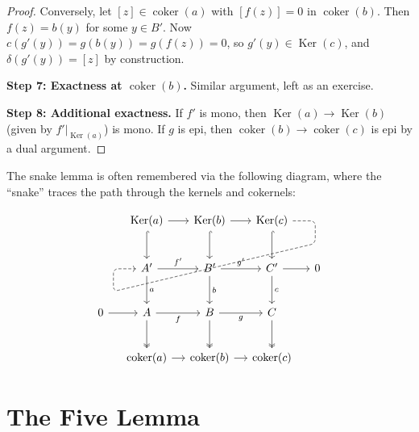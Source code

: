 \documentclass[a4paper,12pt]{book}
\DeclareMathOperator{\Ker}{Ker}
\DeclareMathOperator{\coker}{coker}
\theoremstyle{definition}
\theoremstyle{plain}
\theoremstyle{remark}
\begin{document}
\begin{proof}
Conversely, let $[z] \in \coker(a)$ with $[f(z)] = 0$ in $\coker(b)$. Then
$f(z) = b(y)$ for some $y \in B'$. Now $c(g'(y)) = g(b(y)) = g(f(z)) = 0$, so
$g'(y) \in \Ker(c)$, and $\delta(g'(y)) = [z]$ by construction.

\medskip\noindent
\textbf{Step 7: Exactness at $\coker(b)$.}
Similar argument, left as an exercise.

\medskip\noindent
\textbf{Step 8: Additional exactness.}
If $f'$ is mono, then $\Ker(a) \to \Ker(b)$ (given by $f'|_{\Ker(a)}$) is mono.
If $g$ is epi, then $\coker(b) \to \coker(c)$ is epi by a dual argument.
\end{proof}

The snake lemma is often remembered via the following diagram, where the ``snake''
traces the path through the kernels and cokernels:

\[
\begin{tikzcd}[column sep=1.2em, row sep=2.5em]
    & \Ker(a) \arrow[r] \arrow[d, hookrightarrow] & \Ker(b) \arrow[r] \arrow[d, hookrightarrow]
    & \Ker(c) \arrow[d, hookrightarrow] \arrow[dll, "\delta"', dashed,
    rounded corners, to path={
        -- ([xshift=2em]\tikztostart.east)
        -- ([xshift=2em, yshift=-2em]\tikztostart.east)
        -- ([xshift=-2em, yshift=-2em]\tikztotarget.west)
        -- ([xshift=-2em]\tikztotarget.west)
        -- (\tikztotarget.west)}] \\
    & A' \arrow[r, "f'"] \arrow[d, "a"] & B' \arrow[r, "g'"] \arrow[d, "b"]
    & C' \arrow[r] \arrow[d, "c"] & 0 \\
    0 \arrow[r] & A \arrow[r, "f"'] \arrow[d, twoheadrightarrow]
    & B \arrow[r, "g"'] \arrow[d, twoheadrightarrow] & C \arrow[d, twoheadrightarrow] \\
    & \coker(a) \arrow[r] & \coker(b) \arrow[r] & \coker(c)
\end{tikzcd}
\]


\section{The Five Lemma}\label{sec:five-lemma}
\end{document}
